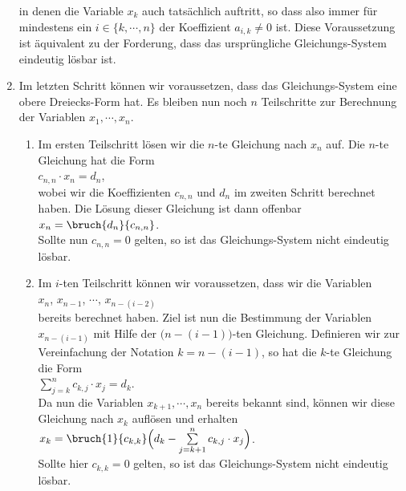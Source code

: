 \begin{enumerate}
      in denen die Variable $x_k$ auch tatsächlich auftritt, so dass also immer für mindestens ein
      $i \in \{ k, \cdots, n\}$ der Koeffizient $a_{i,k} \not= 0$ ist.  
      Diese Voraussetzung ist äquivalent zu der Forderung, dass das ursprüngliche Gleichungs-System
      eindeutig lösbar ist.
\item Im letzten Schritt können wir voraussetzen, dass das Gleichungs-System eine obere Dreiecks-Form
      hat.  Es bleiben nun noch $n$ Teilschritte zur Berechnung der Variablen $x_1,\cdots,x_n$.
      \begin{enumerate}
      \item Im ersten Teilschritt lösen wir die $n$-te Gleichung nach $x_n$ auf.
            Die $n$-te Gleichung hat die Form
            \\[0.2cm]
            \hspace*{1.3cm}
            $c_{n,n} \cdot x_n = d_n$,
            \\[0.2cm] 
            wobei wir die Koeffizienten $c_{n,n}$ und $d_n$ im zweiten Schritt berechnet haben.
            Die Lösung dieser Gleichung ist dann offenbar
            \\[0.2cm]
            \hspace*{1.3cm}
            $x_{n} = \bruch{d_n}{c_{n,n}}$.
            \\[0.2cm]
            Sollte nun $c_{n,n} = 0$ gelten, so ist das Gleichungs-System nicht eindeutig lösbar.
      \item Im $i$-ten Teilschritt können wir voraussetzen, dass wir die Variablen
            \\[0.2cm]
            \hspace*{1.3cm}
            $x_n$, $x_{n-1}$, $\cdots$, $x_{n-(i-2)}$ 
            \\[0.2cm]
            bereits berechnet haben.  Ziel ist nun die Bestimmung der Variablen $x_{n-(i-1)}$ mit Hilfe
            der $\bigl(n-(i-1)\bigr)$-ten Gleichung.  Definieren wir zur Vereinfachung der Notation
            $k = n - (i-1)$, so hat die $k$-te Gleichung die Form
            \\[0.2cm]
            \hspace*{1.3cm}
            $\sum\limits_{j=k}^n c_{k,j} \cdot x_j = d_k$.
            \\[0.2cm]
            Da nun die Variablen $x_{k+1},\cdots,x_n$ bereits bekannt sind, können wir diese Gleichung
            nach $x_k$ auflösen und erhalten
            \\[0.2cm]
            \hspace*{1.3cm}
            $x_k = \bruch{1}{c_{k,k}} \Bigl(d_k - \sum\limits_{j=k+1}^n c_{k,j} \cdot x_j\Bigr)$.
            \\[0.2cm]
            Sollte hier $c_{k,k} = 0$ gelten, so ist das Gleichungs-System nicht eindeutig lösbar.
      \end{enumerate}
\end{enumerate}


